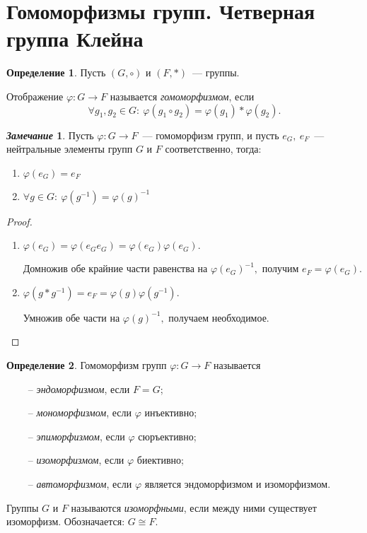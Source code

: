 \documentclass[a4paper, 14pt]{extarticle}
\newcommand{\n}{\par}
\newcommand{\suchthat}{{:}{ } \ }
\renewcommand{\phi}{\varphi}
\theoremstyle{definition}
\newtheorem*{remark}{\textit{Замечание}}
\newtheorem{definition}{Определение}
\theoremstyle{plain}
\numberwithin{theorem}{section}
\numberwithin{definition}{section}
\numberwithin{statement}{section}
\numberwithin{lemma}{section}
\numberwithin{consequence}{section}
\begin{document}
	\section{Гомоморфизмы групп. Четверная группа Клейна}
	\setcounter{definition}{0}
	\begin{definition}
		Пусть $(G, \circ)$ и $( F, *)$~--- группы.
		\n
		Отображение $\phi: G \rightarrow F$ называется \textit{гомоморфизмом}, если
		\begin{equation*}
			\forall g_1, g_2 \in G\suchthat \phi(g_1 \circ g_2) = \phi(g_1) * \phi(g_2).
		\end{equation*}
	\end{definition}
	\begin{remark}
		Пусть ${\phi: G \rightarrow F}$~--- гомоморфизм групп, и пусть ${e_G, \ e_F}$~--- нейтральные элементы групп $G$ и $F$ соответственно, тогда:
		\begin{enumerate}
			\setlength\itemsep{0.1em}
			\item $\phi(e_G) = e_F$
			\item $\forall g \in G\suchthat \phi(g^{-1}) = \phi(g)^{-1}$
		\end{enumerate}
	\end{remark}
	\begin{proof}
		\
		\begin{enumerate}
			\setlength\itemsep{0.1em}
			\item $\phi(e_G) = \phi(e_Ge_G) = \phi(e_G)\phi(e_G).$ \n
			Домножив обе крайние части равенства на $\phi(e_G)^{-1},$ получим
			${e_F = \phi(e_G).}$
			\item $\phi(g * g^{-1}) = e_F = \phi(g)\phi(g^{-1}).$ \n
			Умножив обе части на $\phi(g)^{-1},$ получаем необходимое. \qedhere
		\end{enumerate}
	\end{proof}
	\begin{definition}
		Гомоморфизм групп ${\phi: G \rightarrow F}$ называется 
		\begin{itemize}
			\item [~--] \textit{эндоморфизмом}, если $F = G$;
			\item [~--] \textit{мономорфизмом}, если $\phi$ инъективно;
			\item [~--] \textit{эпиморфизмом}, если $\phi$ сюръективно;
			\item [~--] \textit{изоморфизмом}, если $\phi$ биективно;
			\item [~--] \textit{автоморфизмом}, если $\phi$ является эндоморфизмом и изоморфизмом.
		\end{itemize} \n
		Группы $G$ и $F$ называются \textit{изоморфными}, если между ними существует изоморфизм. Обозначается: $G \cong F.$
	\end{definition}
\end{document}
